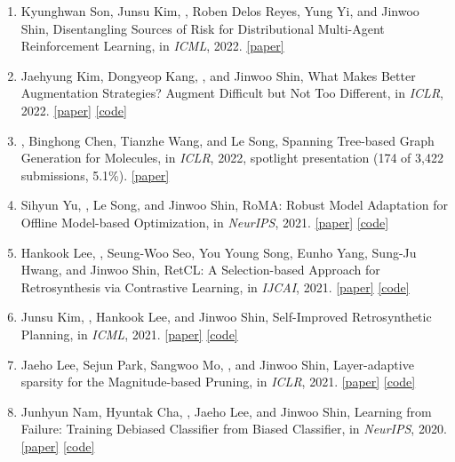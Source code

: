 \begin{enumerate}
\item Kyunghwan Son, Junsu Kim, , Roben Delos Reyes, Yung Yi, and Jinwoo Shin, Disentangling Sources of Risk for Distributional Multi-Agent Reinforcement Learning, in \textit{ICML}, 2022. \mbox{\href{https://proceedings.mlr.press/v162/son22a/son22a.pdf}{[paper]}}
\item Jaehyung Kim, Dongyeop Kang, , and Jinwoo Shin, What Makes Better Augmentation Strategies? Augment Difficult but Not Too Different, in \textit{ICLR}, 2022. \mbox{\href{https://openreview.net/forum?id=Ucx3DQbC9GH}{[paper]}} \mbox{\href{https://github.com/bbuing9/DND}{[code]}}
\item {}, Binghong Chen, Tianzhe Wang, and Le Song, Spanning Tree-based Graph Generation for Molecules, in \textit{ICLR}, 2022, \textcolor{WineRed}{spotlight presentation (174 of 3,422 submissions, 5.1\%)}. \mbox{\href{https://openreview.net/forum?id=w60btE_8T2m}{[paper]}}
\item Sihyun Yu, , Le Song, and Jinwoo Shin, RoMA: Robust Model Adaptation for Offline Model-based Optimization, in \textit{NeurIPS}, 2021. \mbox{\href{https://arxiv.org/abs/2110.14188}{[paper]}} \mbox{\href{https://github.com/sihyun-yu/RoMA}{[code]}}
\item Hankook Lee, , Seung-Woo Seo, You Young Song, Eunho Yang, Sung-Ju Hwang, and Jinwoo Shin, RetCL: A Selection-based Approach for Retrosynthesis via Contrastive Learning, in \textit{IJCAI}, 2021. \mbox{\href{https://arxiv.org/abs/2105.00795}{[paper]}} \mbox{\href{https://github.com/hankook/RetCL}{[code]}}
\item Junsu Kim, , Hankook Lee, and Jinwoo Shin, Self-Improved Retrosynthetic Planning, in \textit{ICML}, 2021. \mbox{\href{https://arxiv.org/abs/2106.04880}{[paper]}} \mbox{\href{https://github.com/junsu-kim97/self_improved_retro}{[code]}}
\item Jaeho Lee, Sejun Park, Sangwoo Mo, , and Jinwoo Shin, Layer-adaptive sparsity for the Magnitude-based Pruning, in \textit{ICLR}, 2021. \mbox{\href{https://arxiv.org/abs/2010.07611}{[paper]}} \mbox{\href{https://github.com/jaeho-lee/layer-adaptive-sparsity}{[code]}}
\item Junhyun Nam, Hyuntak Cha, , Jaeho Lee, and Jinwoo Shin, Learning from Failure: Training Debiased Classifier from Biased Classifier, in \textit{NeurIPS}, 2020. \mbox{\href{https://arxiv.org/abs/2007.02561}{[paper]}} \mbox{\href{https://github.com/alinlab/LfF}{[code]}}

\end{enumerate}
